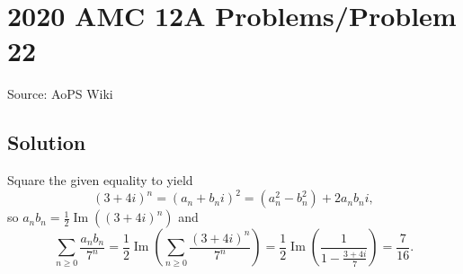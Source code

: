 \documentclass[12pt]{article}
\begin{document}
\section*{{2020 AMC 12A Problems/Problem 22}}
Source: AoPS Wiki

\subsection*{Solution}
Square the given equality to yield \[(3 + 4i)^n = (a_n + b_ni)^2 = (a_n^2 - b_n^2) + 2a_nb_ni,\] so $a_nb_n = \tfrac12\operatorname{Im}((3+4i)^n)$ and \[\sum_{n\geq 0}\frac{a_nb_n}{7^n} = \frac12\operatorname{Im}\left(\sum_{n\geq 0}\frac{(3+4i)^n}{7^n}\right) = \frac12\operatorname{Im}\left(\frac{1}{1 - \frac{3 + 4i}7}\right) = \boxed{\frac 7{16}}.\]
\end{document}
